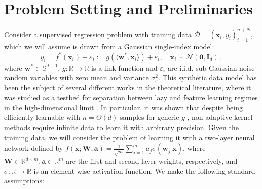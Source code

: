 \section{Problem Setting and Preliminaries}
\label{sec:setting}

Consider a supervised regression problem with training data $\mathcal{D}=(\bm x_{i}, y_{i})_{i=1}^{n+N}$, which we will assume is drawn from a Gaussian single-index model:
\begin{equation}\label{eq:sim}
    y_i = f^*(\bm x_i)  + \varepsilon_i := g(\langle \bm w^*, \bm x_i \rangle) + \varepsilon_i, \quad \bm x_i \sim \mathcal{N}(\bm 0, \bm I_d)\,,
\end{equation}
where $\bm w^*\in \mathbb S^{d-1}$, $g: \mathbb{R} \rightarrow \mathbb{R}$ is a link function and $\varepsilon_i$ are i.i.d. sub-Gaussian noise random variables with zero mean and variance $\sigma_\varepsilon^2$. This synthetic data model has been the subject of several different works in the theoretical literature, where it was studied as a testbed for separation between lazy and feature learning regimes in the high-dimensional limit \citep{arous2021online, damian2022neural, ba2020generalization, dandi2023two}. In particular, it was shown that despite being efficiently learnable with $n=\Theta(d)$ samples for generic $g$ \citep{li1991sliced,babichev2018,barbier2019optimal, damian2024computational,troiani25a}, non-adaptive kernel methods require infinite data to learn it with arbitrary precision.  
Given the training data, we will consider the problem of learning it with a two-layer neural network defined by $f( \bm x; \bm W, \bm a) = \frac{1}{\sqrt{m}} \sum_{j=1}^m a_j \sigma(\bm w_j^{\top} \bm x)$, where $\bm W \in \mathbb R^{d \times m}, \bm a \in \mathbb R^m$ are the first and second layer weights, respectively, and $\sigma:\mathbb R \to \mathbb R$ is an element-wise activation function. %
We make the following standard assumptions:
